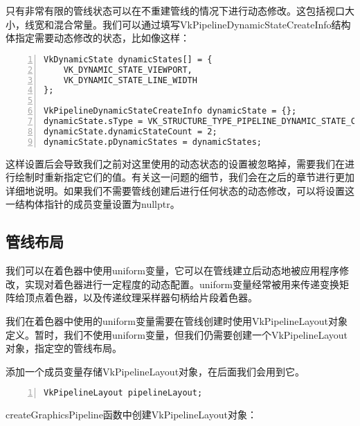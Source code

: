 \documentclass{ctexart}
\begin{document}
只有非常有限的管线状态可以在不重建管线的情况下进行动态修改。这包括视口大小，线宽和混合常量。我们可以通过填写VkPipelineDynamicStateCreateInfo结构体指定需要动态修改的状态，比如像这样：

\begin{lstlisting}[language={[ANSI]C},keywordstyle=\color{blue!70},commentstyle=\color{red!50!green!50!blue!50},frame=shadowbox, rulesepcolor=\color{red!20!green!20!blue!20},basicstyle=\small,numbers=left, numberstyle=\tiny,breaklines=true]
VkDynamicState dynamicStates[] = {
	VK_DYNAMIC_STATE_VIEWPORT,
	VK_DYNAMIC_STATE_LINE_WIDTH
};

VkPipelineDynamicStateCreateInfo dynamicState = {};
dynamicState.sType = VK_STRUCTURE_TYPE_PIPELINE_DYNAMIC_STATE_CREATE_INFO;
dynamicState.dynamicStateCount = 2;
dynamicState.pDynamicStates = dynamicStates;
\end{lstlisting}

这样设置后会导致我们之前对这里使用的动态状态的设置被忽略掉，需要我们在进行绘制时重新指定它们的值。有关这一问题的细节，我们会在之后的章节进行更加详细地说明。如果我们不需要管线创建后进行任何状态的动态修改，可以将设置这一结构体指针的成员变量设置为nullptr。

\subsection{管线布局}

我们可以在着色器中使用uniform变量，它可以在管线建立后动态地被应用程序修改，实现对着色器进行一定程度的动态配置。uniform变量经常被用来传递变换矩阵给顶点着色器，以及传递纹理采样器句柄给片段着色器。

我们在着色器中使用的uniform变量需要在管线创建时使用VkPipelineLayout对象定义。暂时，我们不使用uniform变量，但我们仍需要创建一个VkPipelineLayout对象，指定空的管线布局。

添加一个成员变量存储VkPipelineLayout对象，在后面我们会用到它。

\begin{lstlisting}[language={[ANSI]C},keywordstyle=\color{blue!70},commentstyle=\color{red!50!green!50!blue!50},frame=shadowbox, rulesepcolor=\color{red!20!green!20!blue!20},basicstyle=\small,numbers=left, numberstyle=\tiny,breaklines=true]
VkPipelineLayout pipelineLayout;
\end{lstlisting}

createGraphicsPipeline函数中创建VkPipelineLayout对象：
\end{document}
